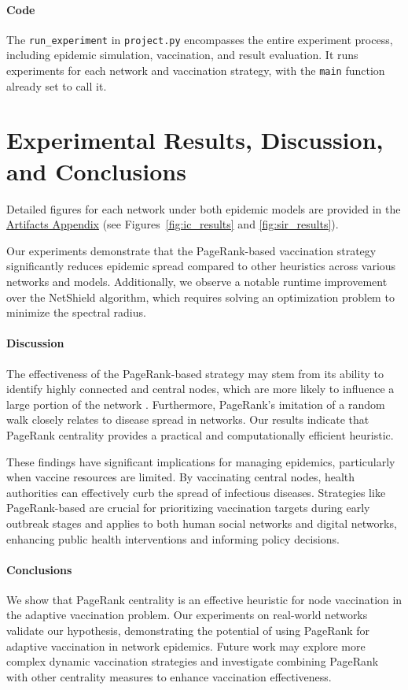 \documentclass[9pt]{extarticle}
\begin{document}
\paragraph{Code} The \texttt{run\_experiment} in \texttt{project.py} encompasses the entire experiment process, including epidemic simulation, vaccination, and result evaluation. It runs experiments for each network and vaccination strategy, with the \texttt{main} function already set to call it.

\section{Experimental Results, Discussion, and Conclusions}
\label{sec:experimental-results-discussion-conclusions}

Detailed figures for each network under both epidemic models are provided in the \hyperref[sec:artifacts]{Artifacts Appendix} (see Figures~\ref{fig:ic_results} and \ref{fig:sir_results}).

Our experiments demonstrate that the PageRank-based vaccination strategy significantly reduces epidemic spread compared to other heuristics across various networks and models. Additionally, we observe a notable runtime improvement over the NetShield algorithm, which requires solving an optimization problem to minimize the spectral radius.

\paragraph{Discussion}
The effectiveness of the PageRank-based strategy may stem from its ability to identify highly connected and central nodes, which are more likely to influence a large portion of the network \cite{page1999pagerank}. Furthermore, PageRank's imitation of a random walk closely relates to disease spread in networks. Our results indicate that PageRank centrality provides a practical and computationally efficient heuristic.

These findings have significant implications for managing epidemics, particularly when vaccine resources are limited. By vaccinating central nodes, health authorities can effectively curb the spread of infectious diseases. Strategies like PageRank-based are crucial for prioritizing vaccination targets during early outbreak stages and applies to both human social networks and digital networks, enhancing public health interventions and informing policy decisions.

\paragraph{Conclusions}
We show that PageRank centrality is an effective heuristic for node vaccination in the adaptive vaccination problem. Our experiments on real-world networks validate our hypothesis, demonstrating the potential of using PageRank for adaptive vaccination in network epidemics. Future work may explore more complex dynamic vaccination strategies and investigate combining PageRank with other centrality measures to enhance vaccination effectiveness.
\end{document}
